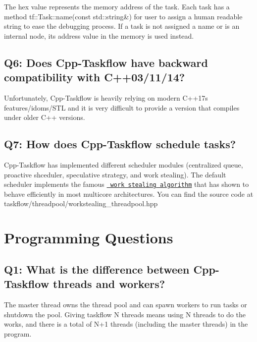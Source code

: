 The hex value represents the memory address of the task. Each task has a method tf\+::\+Task\+::name(const std\+::string\&) for user to assign a human readable string to ease the debugging process. If a task is not assigned a name or is an internal node, its address value in the memory is used instead.\hypertarget{FAQ_GeneralQuestion6}{}\subsection{Q6\+: Does Cpp-\/\+Taskflow have backward compatibility with C++03/11/14?}\label{FAQ_GeneralQuestion6}
Unfortunately, Cpp-\/\+Taskflow is heavily relying on modern C++17\textquotesingle{}s features/idoms/\+S\+TL and it is very difficult to provide a version that compiles under older C++ versions.\hypertarget{FAQ_GeneralQuestion7}{}\subsection{Q7\+: How does Cpp-\/\+Taskflow schedule tasks?}\label{FAQ_GeneralQuestion7}
Cpp-\/\+Taskflow has implemented different scheduler modules (centralized queue, proactive shceduler, speculative strategy, and work stealing). The default scheduler implements the famous \href{https://en.wikipedia.org/wiki/Work_stealing}{\texttt{ work stealing algorithm}} that has shown to behave efficiently in most multicore architectures. You can find the source code at {\ttfamily taskflow/threadpool/workstealing\+\_\+threadpool.\+hpp} 

\DoxyHorRuler
\hypertarget{FAQ_ProgrammingQuestions}{}\section{Programming Questions}\label{FAQ_ProgrammingQuestions}
\hypertarget{FAQ_ProgrammingQuestions1}{}\subsection{Q1\+: What is the difference between Cpp-\/\+Taskflow threads and workers?}\label{FAQ_ProgrammingQuestions1}
The master thread owns the thread pool and can spawn workers to run tasks or shutdown the pool. Giving taskflow {\ttfamily N} threads means using {\ttfamily N} threads to do the works, and there is a total of {\ttfamily N+1} threads (including the master threads) in the program.


\begin{DoxyCode}{0}
\end{DoxyCode}



